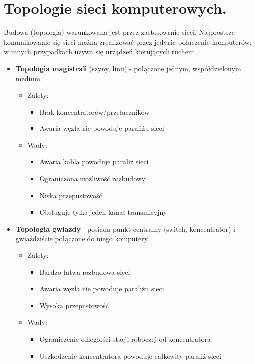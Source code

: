 \documentclass[12pt,a4paper]{article}
\begin{document}
	\section{Topologie sieci komputerowych.}
	Budowa (topologia) warunkowana jest przez zastosowanie sieci. Najprostsze komunikowanie się sieci można zrealizować przez jedynie połączenie komputerów, w innych przypadkach używa się urządzeń kierujących ruchem.
		
	\begin{itemize}
		\item \textbf{Topologia magistrali} (szyny, linii) - połączone jednym, współdzielonym medium.
		\begin{itemize}
			\item Zalety:
			\begin{itemize}
				\item Brak koncentratorów/przełączników
				\item Awaria węzła nie powoduje paraliżu sieci
			\end{itemize}
			\item Wady:
			\begin{itemize}
				\item Awaria kabla powoduje paraliż sieci
				\item Ograniczona możliwość rozbudowy
				\item Niska przepustowość
				\item Obsługuje tylko jeden kanał transmisyjny
			\end{itemize}
		\end{itemize}
	
		\item \textbf{Topologia gwiazdy} - posiada punkt centralny (switch, koncentrator) i gwiaździście połączone do niego komputery.
		\begin{itemize}
			\item Zalety:
			\begin{itemize}
				\item Bardzo łatwa rozbudowa sieci
				\item Awaria węzła nie powoduje paraliżu sieci
				\item Wysoka przepustowość
			\end{itemize}
			\item Wady:
			\begin{itemize}
				\item Ograniczenie odległości stacji roboczej od koncentratora
				\item Uszkodzenie koncentratora powoduje całkowity paraliż sieci
			\end{itemize}
		\end{itemize}
		

\end{itemize}
\end{document}
